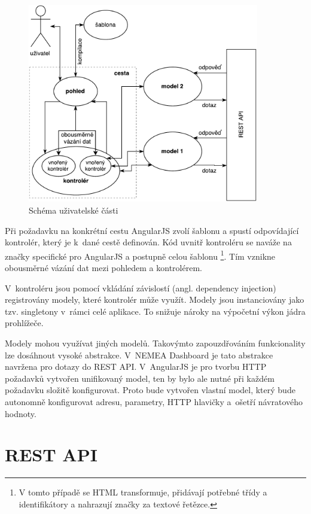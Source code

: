 \begin{figure}[ht]
    \centering
    \includegraphics[width=0.9\textwidth]{fig/frontend.pdf}
    \caption{Schéma uživatelské části} \label{fig:frontend}
\end{figure}

Při požadavku na konkrétní cestu AngularJS zvolí šablonu a spustí odpovídající kontrolér, který je k~dané cestě definován. Kód uvnitř kontroléru se naváže na značky specifické pro AngularJS a postupně celou šablonu \footnote{V tomto případě se HTML transformuje, přidávají potřebné třídy a identifikátory a nahrazují značky za textové řetězce.}. Tím vznikne obousměrné vázání dat mezi pohledem a kontrolérem.

V~kontroléru jsou pomocí vkládání závislostí (angl. dependency injection) registrovány modely, které kontrolér může využít. Modely jsou instanciovány jako tzv. singletony v~rámci celé aplikace. To snižuje nároky na výpočetní výkon jádra prohlížeče.

Modely mohou využívat jiných modelů. Takovýmto zapouzdřováním funkcionality lze dosáhnout vysoké abstrakce. V~NEMEA Dashboard je tato abstrakce navržena pro dotazy do REST API. V~AngularJS je pro tvorbu HTTP požadavků vytvořen unifikovaný model, ten by bylo ale nutné při každém požadavku složitě konfigurovat. Proto bude vytvořen vlastní model, který bude autonomně konfigurovat adresu, parametry, HTTP hlavičky a~ošetří návratového hodnoty.

\section{REST API}
\label{restapi}

